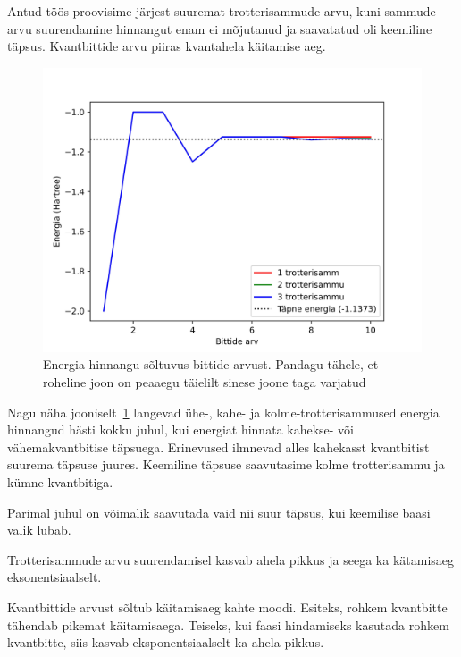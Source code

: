 \documentclass[12pt]{article}
\begin{document}
Antud töös proovisime järjest suuremat trotterisammude arvu, kuni sammude arvu suurendamine hinnangut enam ei mõjutanud ja saavatatud oli keemiline täpsus.
Kvantbittide arvu piiras kvantahela käitamise aeg.

\begin{figure}[h]
    \centering
    \includegraphics{trotsteps.jpg}
    \caption{Energia hinnangu sõltuvus bittide arvust. Pandagu tähele, et roheline joon on peaaegu täielilt sinese joone taga varjatud}
    \label{fig:trotsteps}
\end{figure}

Nagu näha jooniselt~\ref{fig:trotsteps} langevad ühe-, kahe- ja kolme-trotterisammused energia hinnangud hästi kokku juhul, kui energiat hinnata kahekse- või vähemakvantbitise täpsuega.
Erinevused ilmnevad alles kahekasst kvantbitist suurema täpsuse juures.
Keemiline täpsuse saavutasime kolme trotterisammu ja kümne kvantbitiga.

Parimal juhul on võimalik saavutada vaid nii suur täpsus, kui keemilise baasi valik lubab.

Trotterisammude arvu suurendamisel kasvab ahela pikkus ja seega ka kätamisaeg eksonentsiaalselt.

Kvantbittide arvust sõltub käitamisaeg kahte moodi.
Esiteks, rohkem kvantbitte tähendab pikemat käitamisaega.
Teiseks, kui faasi hindamiseks kasutada rohkem kvantbitte, siis kasvab eksponentsiaalselt ka ahela pikkus.
\end{document}
